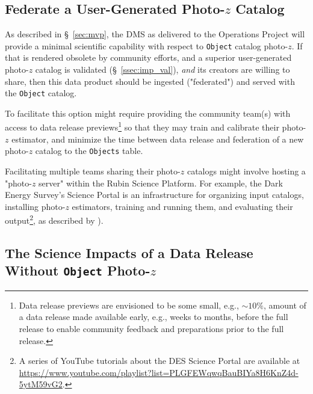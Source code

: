 \documentclass[DM,lsstdraft,toc]{lsstdoc}
\begin{document}
\subsection{Federate a User-Generated Photo-$z$ Catalog}\label{ssec:opts_ugfed}

As described in \S~\ref{sec:mvp}, the DMS as delivered to the Operations Project will provide a minimal scientific capability with respect to {\tt Object} catalog photo-$z$.
If that is rendered obsolete by community efforts, and a superior user-generated photo-$z$ catalog is validated (\S~\ref{ssec:imp_val}), {\it and} its creators are willing to share, then this data product should be ingested ("federated") and served with the {\tt Object} catalog.

To facilitate this option might require providing the community team(s) with access to data release previews\footnote{Data release previews are envisioned to be some small, e.g., $\sim10\%$, amount of a data release made available early, e.g., weeks to months, before the full release to enable community feedback and preparations prior to the full release.} so that they may train and calibrate their photo-$z$ estimator, and minimize the time between data release and federation of a new photo-$z$ catalog to the {\tt Objects} table.

Facilitating multiple teams sharing their photo-$z$ catalogs might involve hosting a "photo-$z$ server" within the Rubin Science Platform.
For example, the Dark Energy Survey's Science Portal is an infrastructure for organizing input catalogs, installing photo-$z$ estimators, training and running them, and evaluating their output\footnote{A series of YouTube tutorials about the DES Science Portal are available at \url{https://www.youtube.com/playlist?list=PLGFEWqwqBauBIYa8H6KnZ4d-5ytM59vG2}.}, as described by \citet{2018A&C....25...58G}).


\subsection{The Science Impacts of a Data Release Without {\tt Object} Photo-$z$}\label{ssec:opts_none}
\end{document}
